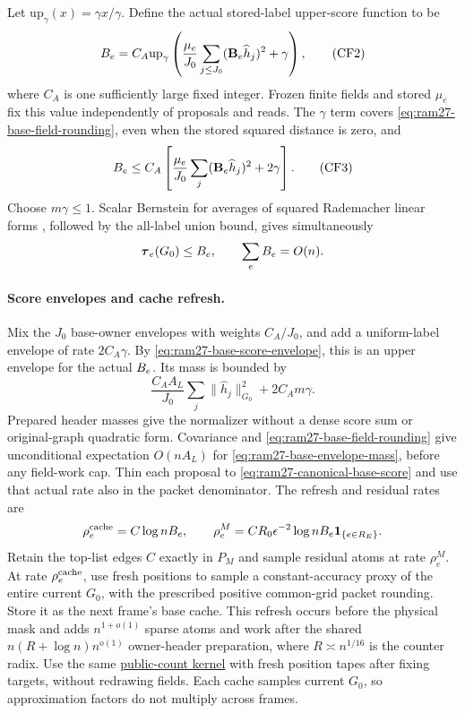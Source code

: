 \documentclass[11pt]{article}
\theoremstyle{remark}
\newcommand{\BB}{\mathbf B}
\newcommand{\ttau}{\boldsymbol{\tau}}
\newcommand{\norm}[1]{\lVert#1\rVert}
\begin{document}
Let $\mathrm{up}_\gamma(x)=\gamma x/\gamma $.
Define the actual stored-label upper-score function to be
\[
 \mathcal \BB_e
 =C_A\mathrm{up}_\gamma
 \left(\frac{\mu_e}{J_0}
                 \sum_{j\le J_0}(\BB_e\widehat h_j)^2+\gamma\right),
 \tag{CF2}\label{eq:ram27-canonical-base-score}
\]
where $C_A$ is one sufficiently large fixed integer.
Frozen finite fields and stored $\mu_e$ fix this value independently of
proposals and reads.
The $\gamma$ term covers \eqref{eq:ram27-base-field-rounding}, even when the
stored squared distance is zero, and
\[
 \mathcal \BB_e\le C_A\left[
       \frac{\mu_e}{J_0}\sum_j(\BB_e\widehat h_j)^2+2\gamma\right].
 \tag{CF3}\label{eq:ram27-base-score-envelope}
\]
Choose $m\gamma\le1$.
Scalar Bernstein for averages of squared Rademacher linear forms
\cite[Theorem~6.2, scalar case]{T12:journal}, followed by the all-label union
bound, gives simultaneously
\[
 \ttau_e(G_0)\le\mathcal \BB_e,\qquad
                       \sum_e\mathcal \BB_e=O(n).
\]

\paragraph{Score envelopes and cache refresh.}
Mix the $J_0$ base-owner envelopes with weights $C_A/J_0$, and add a
uniform-label envelope of rate $2C_A\gamma$.
By \eqref{eq:ram27-base-score-envelope}, this is an upper envelope for the
actual $\mathcal \BB_e$.
Its mass is bounded by
\[
 \frac{C_AA_L}{J_0}\sum_j\norm{\widehat h_j}_{G_0}^2+2C_Am\gamma .
 \tag{CF4}\label{eq:ram27-base-envelope-mass}
\]
Prepared header masses give the normalizer without a dense score sum or
original-graph quadratic form.
Covariance and \eqref{eq:ram27-base-field-rounding} give unconditional
expectation $O(nA_L)$ for \eqref{eq:ram27-base-envelope-mass}, before any
field-work cap.
Thin each proposal to \eqref{eq:ram27-canonical-base-score} and use that actual
rate also in the packet denominator.
The refresh and residual rates are
\[
 \rho_e^{\rm cache}=C\log n\mathcal \BB_e,\qquad
 \rho_e^M=CR_0\epsilon^{-2}\log n\mathcal \BB_e
                   \mathbf1_{\{e\in R_E\}}.
\]
Retain the top-list edges $C$ exactly in $P_M$ and sample residual atoms at rate
$\rho_e^M$.
At rate $\rho_e^{\rm cache}$, use fresh positions to sample a constant-accuracy
proxy of the entire current $G_0$, with the prescribed positive common-grid
packet rounding.
Store it as the next frame's base cache.
This refresh occurs before the physical mask and adds $n^{1+o(1)}$ sparse atoms
and work after the shared $n(R+\log n)n^{o(1)}$ owner-header preparation, where
$R\asymp n^{1/16}$ is the counter radix.
Use the same \hyperref[par:ram30-categorical]{public-count kernel} with fresh
position tapes after fixing targets, without redrawing fields.
Each cache samples current $G_0$, so approximation factors do not multiply
across frames.
\end{document}
